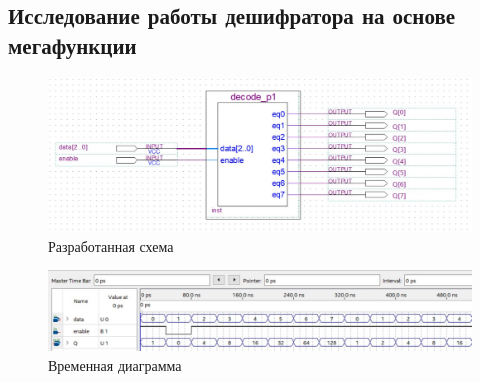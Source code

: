 \documentclass[a4paper,12pt]{article}
\begin{document}
    \subsection{Исследование работы дешифратора на основе мегафункции}
    \begin{figure}[H]
        \centering
        \includegraphics[width=\linewidth]{scheme_first}
        \caption{Разработанная схема}
    \end{figure}
    \begin{figure}[H]
        \centering
        \includegraphics[width=\linewidth]{wave_first}
        \caption{Временная диаграмма}
    \end{figure}
\end{document}

